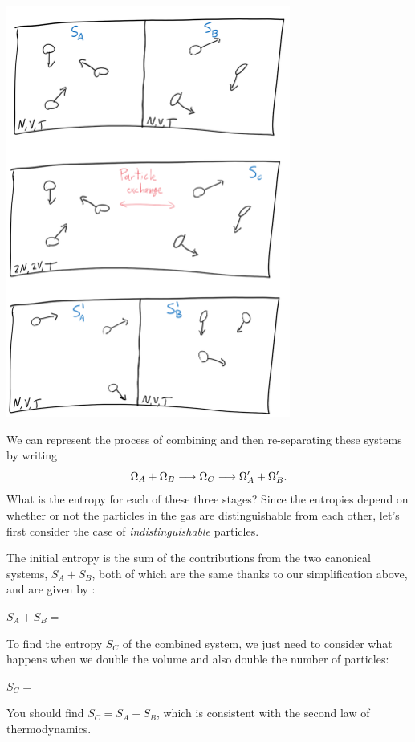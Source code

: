 \begin{center}
  \includegraphics[width=0.7\textwidth]{figs/week04_mixing.pdf}
\end{center}

We can represent the process of combining and then re-separating these systems by writing
\begin{equation*}
  \Omega_A + \Omega_B \longrightarrow \Omega_C \longrightarrow \Omega_A' + \Omega_B'.
\end{equation*}
What is the entropy for each of these three stages?
Since the entropies depend on whether or not the particles in the gas are distinguishable from each other, let's first consider the case of \textit{indistinguishable} particles.

\newpage %
The initial entropy is the sum of the contributions from the two canonical systems, $S_A + S_B$, both of which are the same thanks to our simplification above, and are given by :
\begin{mdframed}
  $\displaystyle S_A + S_B = $ \\[50 pt]
\end{mdframed}
To find the entropy $S_C$ of the combined system, we just need to consider what happens when we double the volume and also double the number of particles:
\begin{mdframed}
  $\displaystyle S_C = $ \\[50 pt]
\end{mdframed}
You should find $S_C = S_A + S_B$, which is consistent with the second law of thermodynamics.

